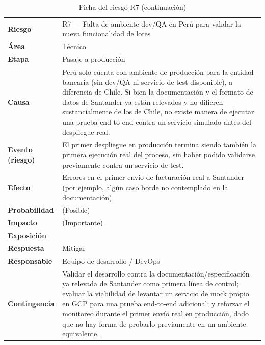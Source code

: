 \begin{longtable}[]{@{}
  >{\raggedright\arraybackslash}p{}
  >{\raggedright\arraybackslash}p{}@{}}
\caption{Ficha del riesgo R7}\label{tab:11}\\
\toprule\noalign{}
\endfirsthead
\caption[]{Ficha del riesgo R7 (continuación)}\\
\toprule\noalign{}
\endhead
\bottomrule\noalign{}
\endlastfoot
\textbf{Riesgo} & R7 --- Falta de ambiente dev/QA en Perú para validar la nueva funcionalidad de lotes \\
\textbf{Área} & Técnico \\
\textbf{Etapa} & Pasaje a producción \\
\textbf{Causa} & Perú solo cuenta con ambiente de producción para la entidad bancaria (sin dev/QA ni servicio de test disponible), a diferencia de Chile. Si bien la documentación y el formato de datos de Santander ya están relevados y no difieren sustancialmente de los de Chile, no existe manera de ejecutar una prueba end-to-end contra un servicio simulado antes del despliegue real. \\
\textbf{Evento (riesgo)} & El primer despliegue en producción termina siendo también la primera ejecución real del proceso, sin haber podido validarse previamente contra un servicio de test. \\
\textbf{Efecto} & Errores en el primer envío de facturación real a Santander (por ejemplo, algún caso borde no contemplado en la documentación). \\
\textbf{Probabilidad} & 3 (Posible) \\
\textbf{Impacto} & 4 (Importante) \\
\textbf{Exposición} & 12 \\
\textbf{Respuesta} & Mitigar \\
\textbf{Responsable} & Equipo de desarrollo / DevOps \\
\textbf{Contingencia} & Validar el desarrollo contra la documentación/especificación ya relevada de Santander como primera línea de control; evaluar la viabilidad de levantar un servicio de mock propio en GCP para una prueba end-to-end adicional; y reforzar el monitoreo durante el primer envío real en producción, dado que no hay forma de probarlo previamente en un ambiente equivalente. \\
\end{longtable}


